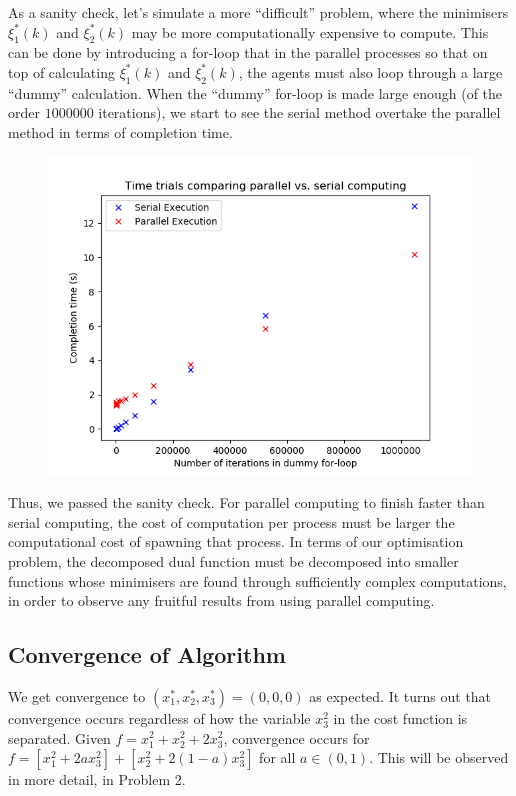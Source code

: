 \documentclass[12pt]{article}
\begin{document}
As a sanity check, let's simulate a more ``difficult'' problem, where the minimisers $\xi_1^*(k)$ and $\xi_2^*(k)$ may be more computationally expensive to compute. This can be done by introducing a for-loop that in the parallel processes so that on top of calculating $\xi_1^*(k)$ and $\xi_2^*(k)$, the agents must also loop through a large ``dummy'' calculation. When the ``dummy'' for-loop is made large enough (of the order $1000000$ iterations), we start to see the serial method overtake the parallel method in terms of completion time.

\begin{figure}[H]
	\includegraphics[scale=1]{Problem1-TimeTrial.png}
\end{figure}

Thus, we passed the sanity check. For parallel computing to finish faster than serial computing, the cost of computation per process must be larger the computational cost of spawning that process. In terms of our optimisation problem, the decomposed dual function must be decomposed into smaller functions whose minimisers are found through sufficiently complex computations, in order to observe any fruitful results from using parallel computing.

\subsection*{Convergence of Algorithm}

We get convergence to $(x_1^*,x_2^*,x_3^*)=(0,0,0)$ as expected. It turns out that convergence occurs regardless of how the variable $x_3^2$ in the cost function is separated. Given $f=x_1^2+x_2^2+2x_3^2$, convergence occurs for $f=[x_1^2+2ax_3^2]+[x_2^2+2(1-a)x_3^2]$ for all $a\in(0,1)$. This will be observed in more detail, in Problem 2.
\end{document}
